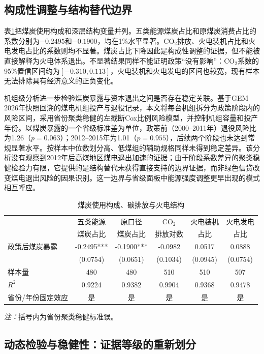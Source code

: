 \documentclass[UTF8,12pt]{ctexart}
\newcommand{\note}[1]{\begin{minipage}{0.96\textwidth}\footnotesize\textit{注：}#1\end{minipage}}
\begin{document}
\subsection{构成性调整与结构替代边界}

表\ref{tab:structure}把煤炭使用构成和深层结构变量并列。五类能源煤炭占比和原煤炭消费占比的系数分别为$-0.2495$和$-0.1900$，均在1\%水平显著。CO$_2$排放、火电装机占比和火电发电占比的系数则均不显著。煤炭占比下降因此是构成性调整的证据，但不能被直接解释为火电体系退出。不显著结果同样不能证明政策“没有影响”：CO$_2$系数的95\%置信区间约为$[-0.310,0.113]$，火电装机和火电发电的区间也较宽，现有样本无法排除具有经济意义的正负变化。

机组级分析进一步检验煤炭暴露与资本退出之间是否存在稳定关联。基于GEM 2026年快照回溯的煤电机组投产与退役记录，本文将每台机组拆分为政策阶段内的风险区间，采用省份聚类稳健的左截断Cox比例风险模型，并控制机组容量和投产年份。以煤炭暴露的一个省级标准差为单位，政策前（2000--2011年）退役风险比为1.26（$p=0.063$）；2012--2015年为1.01（$p=0.955$），后续两个阶段也未达到常规显著水平。按样本中位数划分高、低煤组的辅助规格同样未得到稳定差异。该分析没有观察到2012年后高煤地区煤电退出加速的证据；由于阶段系数差异的聚类稳健检验力有限，它提供的是结构替代未获得直接支持的边界证据，而非绿色信贷改变煤电退出风险的因果识别。这一边界与省级面板中能源强度调整更早出现的模式相互呼应。

\begin{table}[H]
\centering
\caption{煤炭使用构成、碳排放与火电结构}
\label{tab:structure}
\begin{tabular}{lccccc}
\toprule
 & 五类能源 & 原口径 & CO$_2$ & 火电装机 & 火电发电 \\
 & 煤炭占比 & 煤炭占比 & 排放对数 & 占比 & 占比 \\
\midrule
政策后煤炭暴露 & -0.2495*** & -0.1900*** & -0.0982 & 0.0517 & 0.0888 \\
 & (0.0754) & (0.0651) & (0.1034) & (0.0945) & (0.0754) \\
样本量 & 480 & 480 & 510 & 510 & 507 \\
$R^2$ & 0.9224 & 0.9382 & 0.9904 & 0.9368 & 0.9478 \\
省份/年份固定效应 & 是 & 是 & 是 & 是 & 是 \\
\bottomrule
\end{tabular}
\note{括号内为省份聚类稳健标准误。}
\end{table}

\subsection{动态检验与稳健性：证据等级的重新划分}
\end{document}
